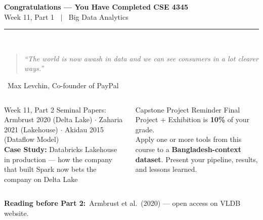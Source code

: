 \documentclass[aspectratio=169,10pt]{beamer}
\begin{document}
\begin{frame}[c]
  \begin{center}
    {\Large\bfseries Congratulations --- You Have Completed CSE 4345}\\[8pt]
    {\large Week 11, Part 1 $\;\mid\;$ Big Data Analytics}\\[8pt]
    \textcolor{PUGray}{\rule{7cm}{0.5pt}}\\[10pt]
    \begin{quote}
      \itshape ``The world is now awash in data and we can see consumers in a lot clearer ways.''
    \end{quote}
    \hfill\textemdash\ Max Levchin, Co-founder of PayPal

    \vspace{10pt}
    \begin{columns}
        \begin{block}{\centering Week 11, Part 2}
          \centering\small
          Seminal Papers: Armbrust 2020 (Delta Lake) $\cdot$ Zaharia 2021 (Lakehouse) $\cdot$ Akidau 2015 (Dataflow Model)\\[4pt]
          \textbf{Case Study:} Databricks Lakehouse in production --- how the company that built Spark now bets the company on Delta Lake
        \end{block}

        \begin{alertblock}{\centering Capstone Project Reminder}
          \centering\small
          Final Project + Exhibition is \textbf{10\%} of your grade.\\[4pt]
          Apply one or more tools from this course to a \textbf{Bangladesh-context dataset}.  Present your pipeline, results, and lessons learned.
        \end{alertblock}
    \end{columns}

    \vspace{6pt}
    \textbf{Reading before Part 2:}\ Armbrust et al.\ (2020) --- open access on VLDB website.
  \end{center}
\end{frame}

\end{document}
